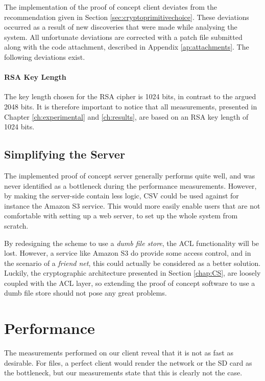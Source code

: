 \documentclass[pdftex,english,10pt,b5paper,twoside]{book}
\begin{document}
The implementation of the proof of concept client deviates from
the recommendation given in Section \ref{sec:cryptoprimitivechoice}. 
These deviations occurred as a result of new discoveries that were made while analysing
the system. All unfortunate deviations are corrected with a patch file submitted
along with the code attachment, described in Appendix \ref{ap:attachments}. The
following deviations exist.

\paragraph{RSA Key Length} The key length chosen for the RSA cipher is 1024
bits, in contrast to the argued 2048 bits. It is therefore important to notice
that all measurements, presented in Chapter \ref{ch:experimental} and
\ref{ch:results}, are based on an RSA key length of 1024 bits.

\subsection{Simplifying the Server}

The implemented proof of concept server generally performs quite well, and was
never identified as a bottleneck during the performance measurements. However,
by making the server-side contain less logic, \ac{CSV} could be used against
for instance the Amazon S3 service. This would more easily enable users that
are not comfortable with setting up a web server, to set up the whole system
from scratch.

By redesigning the scheme to use a \emph{dumb file store}, the \ac{ACL}
functionality will be lost. However, a service like Amazon S3 do provide some
access control, and in the scenario of a \emph{friend net}, this could actually
be considered as a better solution. Luckily, the cryptographic architecture
presented in Section \ref{chap:CS}, are loosely coupled with the \ac{ACL}
layer, so extending the proof of concept software to use a dumb file store
should not pose any great problems.

\section{Performance}

The measurements performed on our client reveal that it is not as fast as
desirable. For files, a perfect client would render the network or the SD card
as the bottleneck, but our measurements state that this is clearly not the
case. 
\end{document}
